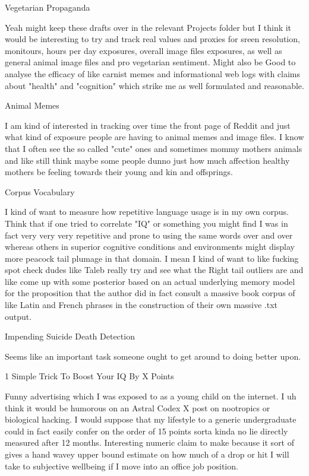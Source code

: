 	Vegetarian Propaganda

Yeah might keep these drafts over in the relevant Projects folder but I think it would be interesting to try and track real values and proxies for sreen resolution, monitours, hours per day exposures, overall image files exposures, as well as general animal image files and pro vegetarian sentiment. Might also be Good to analyse the efficacy of like carnist memes and informational web logs with claims about "health" and "cognition" which strike me as well formulated and reasonable.

	Animal Memes

I am kind of interested in tracking over time the front page of Reddit and just what kind of exposure people are having to animal memes and image files. I know that I often see the so called "cute" ones and sometimes mommy mothers animals and like still think maybe some people dunno just how much affection healthy mothers be feeling towards their young and kin and offsprings.

	Corpus Vocabulary

I kind of want to measure how repetitive language usage is in my own corpus. Think that if one tried to correlate "IQ" or something you might find I was in fact very very very repetitive and prone to using the same words over and over whereas others in superior cognitive conditions and environments might display more peacock tail plumage in that domain. I mean I kind of want to like fucking spot check dudes like Taleb really try and see what the Right tail outliers are and like come up with some posterior based on an actual underlying memory model for the proposition that the author did in fact consult a massive book corpus of like Latin and French phrases in the construction of their own massive .txt output.

	Impending Suicide Death Detection

Seems like an important task someone ought to get around to doing better upon.

	1 Simple Trick To Boost Your IQ By X Points

Funny advertising which I was exposed to as a young child on the internet. I uh think it would be humorous on an Astral Codex X post on nootropics or biological hacking. I would suppose that my lifestyle to a generic undergraduate could in fact easily confer on the order of 15 points sorta kinda no lie directly measured after 12 months. Interesting numeric claim to make because it sort of gives a hand wavey upper bound estimate on how much of a drop or hit I will take to subjective wellbeing if I move into an office job position.

